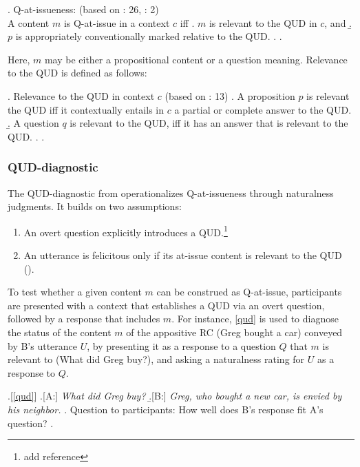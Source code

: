 \documentclass[times,linguex]{glossa}
\begin{document}
    \ex. \label{def:qai}%
      Q-at-issueness: \hfill (based on \citealt{simons_what_2010}: 26, \citealt{koev_notions_2018}: 2)\\
      A content $m$ is Q-at-issue in a context $c$ iff
      \a. \label{def:qai-relevant}%
        $m$ is relevant to the QUD in $c$, and
      \b.  \label{def:qai-conventional}%
        $p$ is appropriately conventionally marked relative to the QUD.
      \z. 
    \z.

    Here, $m$ may be either a propositional content or a question meaning. Relevance to the QUD is defined as follows:

    \ex. Relevance to the QUD in context $c$ \hfill (based on \citealt{simons_what_2010}: 13)
      \a. A proposition $p$ is relevant the QUD iff it contextually entails in $c$ a partial or complete answer to the QUD.
      \b. A question $q$ is relevant to the QUD, iff it has an answer that is relevant to the QUD.
      \z.
    \z.

    \subsubsection{QUD-diagnostic}
    The QUD-diagnostic from \citealt{tonhauser_diagnosing_2012} operationalizes Q-at-issueness through naturalness judgments. It builds on two assumptions:
    \begin{enumerate}
      \item An overt question explicitly introduces a QUD.\footnote{add reference}
      \item An utterance is felicitous only if its at-issue content is relevant to the QUD (\citealt{amaral_review_2007,tonhauser_diagnosing_2012}).
    \end{enumerate}

    \noindent To test whether a given content $m$ can be construed as Q-at-issue, participants are presented with a context that establishes a QUD via an overt question, followed by a response that includes $m$. For instance, \ref{qud} is used to diagnose the status of the content $m$ of the appositive RC (Greg bought a car) conveyed by B's utterance $U$, by presenting it as a response to a question $Q$ that $m$ is relevant to (What did Greg buy?), and asking a naturalness rating for $U$ as a response to $Q$.

    \ex.[\ref{qud}]
      \a.[A:] \emph{What did Greg buy?}
      \b.[B:] \emph{Greg, who bought a new car, is envied by his neighbor.}
      \z.
      Question to participants: How well does B's response fit A's question?
    \z.
\end{document}
